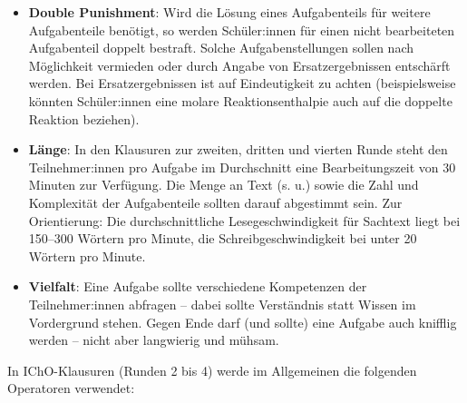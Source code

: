 \documentclass[./main.tex]{subfiles}
\begin{document}
\begin{itemize}
    \item \textbf{Double Punishment}: Wird die L\"osung eines Aufgabenteils f\"ur weitere Aufgabenteile ben\"otigt, so werden Sch\"uler:innen f\"ur einen nicht bearbeiteten Aufgabenteil doppelt bestraft. Solche Aufgabenstellungen sollen nach M\"oglichkeit vermieden oder durch Angabe von Ersatzergebnissen entsch\"arft werden. Bei Ersatzergebnissen ist auf Eindeutigkeit zu achten (beispielsweise k\"onnten Sch\"uler:innen eine molare Reaktionsenthalpie auch auf die doppelte Reaktion beziehen).
    \item \textbf{L\"ange}: In den Klausuren zur zweiten, dritten und vierten Runde steht den Teilnehmer:innen pro Aufgabe im Durchschnitt eine Bearbeitungszeit von 30 Minuten zur Verf\"ugung. Die Menge an Text (s. u.) sowie die Zahl und Komplexit\"at der Aufgabenteile sollten darauf abgestimmt sein. Zur Orientierung: Die durchschnittliche Lesegeschwindigkeit f\"ur Sachtext liegt bei 150--300 W\"ortern pro Minute, die Schreibgeschwindigkeit bei unter 20 W\"ortern pro Minute.
    \item \textbf{Vielfalt}: Eine Aufgabe sollte verschiedene Kompetenzen der Teilnehmer:innen abfragen -- dabei sollte Verst\"andnis statt Wissen im Vordergrund stehen. Gegen Ende darf (und sollte) eine Aufgabe auch knifflig werden -- nicht aber langwierig und m\"uhsam. 
\end{itemize}
\newpage
In IChO-Klausuren (Runden 2 bis 4) werde im Allgemeinen die folgenden Operatoren verwendet:\\
\end{document}
